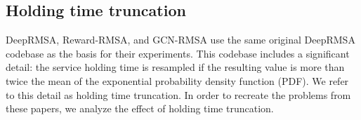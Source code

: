 




















\subsection{Holding time truncation}
\label{sec:holding_time}

DeepRMSA, Reward-RMSA, and GCN-RMSA use the same original DeepRMSA codebase as the basis for their experiments. This codebase includes a significant detail: the service holding time is resampled if the resulting value is more than twice the mean of the exponential probability density function (PDF). We refer to this detail as holding time truncation.  In order to recreate the problems from these papers, we analyze the effect of holding time truncation.


